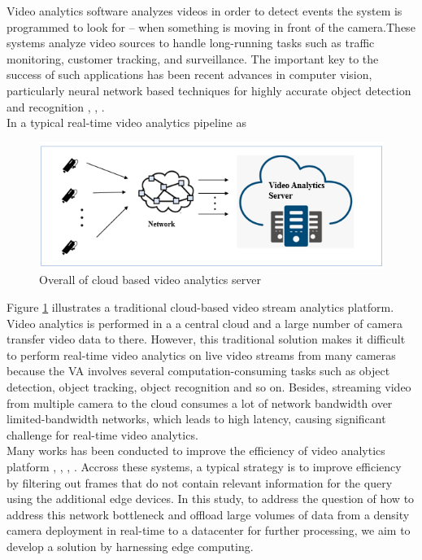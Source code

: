 Video analytics software analyzes videos in order to detect events the system is programmed to look for – when something is moving in front of the camera.These systems analyze video sources to handle long-running tasks such as traffic monitoring, customer tracking, and surveillance. The important key to the success of such applications has been recent advances in computer vision, particularly neural network based techniques for highly accurate object detection and recognition \cite{cai2015learning}, \cite{krizhevsky2017imagenet}, \cite{li2015convolutional}.\\
In a typical real-time video analytics pipeline as 
\begin{figure}
\centering
 \includegraphics[width=1.0\linewidth]{Figures/cloud.png}
 \caption{Overall of cloud based video analytics server}
 \label{fig:overall}
\end{figure}
Figure \ref{fig:overall} illustrates a traditional cloud-based video stream analytics platform. Video analytics is performed in a a central cloud and a large number of camera transfer video data to there. However, this traditional solution makes it difficult to perform real-time video analytics on live video streams from many cameras because the VA involves several computation-consuming tasks such as object detection, object tracking, object recognition and so on. Besides, streaming video from multiple camera to the cloud consumes a lot of network bandwidth over limited-bandwidth networks, which leads to high latency, causing significant challenge for real-time video analytics.\\
Many works has been conducted to improve the efficiency of video analytics platform \cite{canel2019scaling}, \cite{chen2015glimpse}, \cite{hsieh2018focus}, \cite{jiang2018chameleon}. Accross these systems, a typical strategy is to improve efficiency by filtering out frames that do not contain relevant information for the query using the additional edge devices. In this study, to address the question of how to address this network bottleneck and offload large volumes of data from a density camera deployment in real-time to a datacenter for further processing, we aim to develop a solution by harnessing edge computing.
